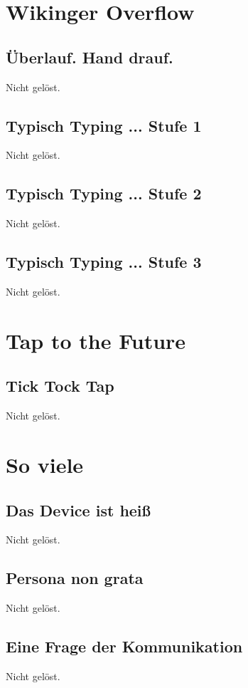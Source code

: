 \documentclass[12pt, a4paper, titlepage, oneside]{scrartcl}
\begin{document}
	\section{Wikinger Overflow}

	\subsection{\"Uberlauf. Hand drauf.}
	Nicht gelöst.

	\subsection{Typisch Typing ... Stufe 1}
	Nicht gelöst.

	\subsection{Typisch Typing ... Stufe 2}
	Nicht gelöst.

	\subsection{Typisch Typing ... Stufe 3}
	Nicht gelöst.

	\section{Tap to the Future}

	\subsection{Tick Tock Tap}
	Nicht gelöst.

	\section{So viele}

	\subsection{Das Device ist heiß}
	Nicht gelöst.

	\subsection{Persona non grata}
	Nicht gelöst.

	\subsection{Eine Frage der Kommunikation}
	Nicht gelöst.
\end{document}
